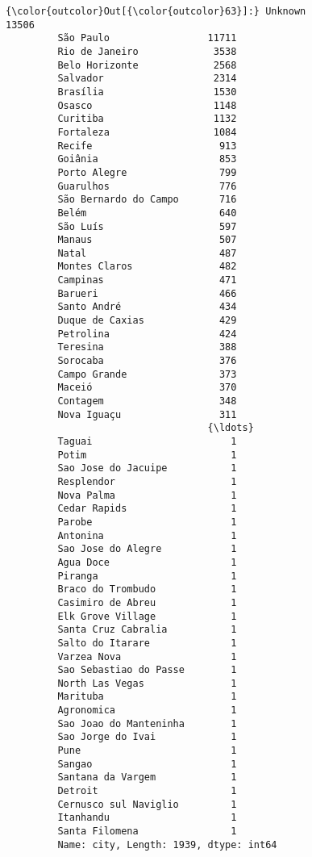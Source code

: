 \documentclass[11pt]{article}
\begin{document}
\begin{Verbatim}[commandchars=\\\{\}]
{\color{outcolor}Out[{\color{outcolor}63}]:} Unknown                   13506
         São Paulo                 11711
         Rio de Janeiro             3538
         Belo Horizonte             2568
         Salvador                   2314
         Brasília                   1530
         Osasco                     1148
         Curitiba                   1132
         Fortaleza                  1084
         Recife                      913
         Goiânia                     853
         Porto Alegre                799
         Guarulhos                   776
         São Bernardo do Campo       716
         Belém                       640
         São Luís                    597
         Manaus                      507
         Natal                       487
         Montes Claros               482
         Campinas                    471
         Barueri                     466
         Santo André                 434
         Duque de Caxias             429
         Petrolina                   424
         Teresina                    388
         Sorocaba                    376
         Campo Grande                373
         Maceió                      370
         Contagem                    348
         Nova Iguaçu                 311
                                   {\ldots}  
         Taguai                        1
         Potim                         1
         Sao Jose do Jacuipe           1
         Resplendor                    1
         Nova Palma                    1
         Cedar Rapids                  1
         Parobe                        1
         Antonina                      1
         Sao Jose do Alegre            1
         Agua Doce                     1
         Piranga                       1
         Braco do Trombudo             1
         Casimiro de Abreu             1
         Elk Grove Village             1
         Santa Cruz Cabralia           1
         Salto do Itarare              1
         Varzea Nova                   1
         Sao Sebastiao do Passe        1
         North Las Vegas               1
         Marituba                      1
         Agronomica                    1
         Sao Joao do Manteninha        1
         Sao Jorge do Ivai             1
         Pune                          1
         Sangao                        1
         Santana da Vargem             1
         Detroit                       1
         Cernusco sul Naviglio         1
         Itanhandu                     1
         Santa Filomena                1
         Name: city, Length: 1939, dtype: int64
\end{Verbatim}
            
\end{document}
